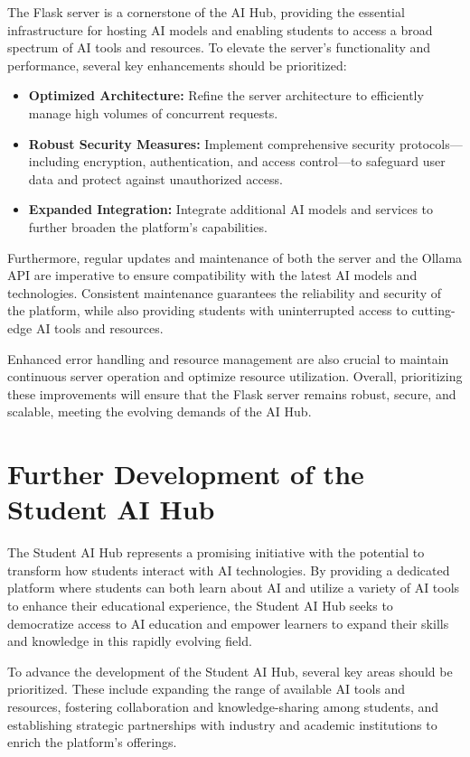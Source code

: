 The Flask server is a cornerstone of the AI Hub, providing the essential infrastructure for hosting AI models and enabling students to access a broad spectrum of AI tools and resources. To elevate the server’s functionality and performance, several key enhancements should be prioritized:

\begin{itemize}
    \item \textbf{Optimized Architecture:} Refine the server architecture to efficiently manage high volumes of concurrent requests.
    \item \textbf{Robust Security Measures:} Implement comprehensive security protocols—including encryption, authentication, and access control—to safeguard user data and protect against unauthorized access.
    \item \textbf{Expanded Integration:} Integrate additional AI models and services to further broaden the platform’s capabilities.
\end{itemize}

Furthermore, regular updates and maintenance of both the server and the Ollama API are imperative to ensure compatibility with the latest AI models and technologies. Consistent maintenance guarantees the reliability and security of the platform, while also providing students with uninterrupted access to cutting-edge AI tools and resources.

Enhanced error handling and resource management are also crucial to maintain continuous server operation and optimize resource utilization. Overall, prioritizing these improvements will ensure that the Flask server remains robust, secure, and scalable, meeting the evolving demands of the AI Hub.

\section{Further Development of the Student AI Hub}

The Student AI Hub represents a promising initiative with the potential to transform how students interact with AI technologies. By providing a dedicated platform where students can both learn about AI and utilize a variety of AI tools to enhance their educational experience, the Student AI Hub seeks to democratize access to AI education and empower learners to expand their skills and knowledge in this rapidly evolving field.

To advance the development of the Student AI Hub, several key areas should be prioritized. These include expanding the range of available AI tools and resources, fostering collaboration and knowledge-sharing among students, and establishing strategic partnerships with industry and academic institutions to enrich the platform’s offerings.

